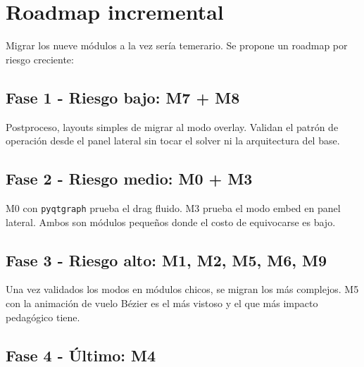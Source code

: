 \documentclass[11pt,a4paper]{article}
\begin{document}
\section{Roadmap incremental}

Migrar los nueve módulos a la vez sería temerario. Se propone un
roadmap por riesgo creciente:

\begin{center}
\end{center}

\subsection*{Fase 1 - Riesgo bajo: M7 + M8}

Postproceso, layouts simples de migrar al modo overlay. Validan el
patrón de operación desde el panel lateral sin tocar el solver ni la
arquitectura del base.

\subsection*{Fase 2 - Riesgo medio: M0 + M3}

M0 con \texttt{pyqtgraph} prueba el drag fluido. M3 prueba el modo
embed en panel lateral. Ambos son módulos pequeños donde el costo de
equivocarse es bajo.

\subsection*{Fase 3 - Riesgo alto: M1, M2, M5, M6, M9}

Una vez validados los modos en módulos chicos, se migran los más
complejos. M5 con la animación de vuelo Bézier es el más vistoso y el
que más impacto pedagógico tiene.

\subsection*{Fase 4 - Último: M4}
\end{document}
